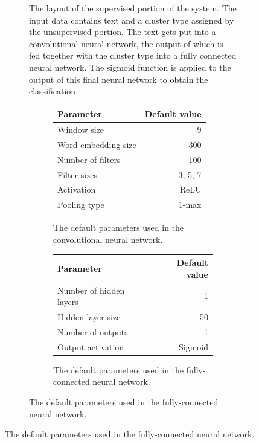 \begin{figure}[p]
\begin{subfigure}[b]{0.45\textwidth}
    \caption{The layout of the supervised portion of the system. The input data
      contains text and a cluster type assigned by the unsupervised portion. The
      text gets put into a convolutional neural network, the output of which is
      fed together with the cluster type into a fully connected neural network.
      The sigmoid function is applied to the output of this final neural network
    to obtain the classification.\label{fig:nn_layout}}
  \end{subfigure}
  \hspace{0.05\textwidth}
  \begin{subfigure}[b]{0.45\textwidth}
    \begin{subfigure}[b]{\textwidth}
      \centering
      \begin{tabular}{lr}
	\toprule
	Parameter & Default value \\
	\midrule
	Window size & 9 \\
	Word embedding size & 300 \\
	Number of filters & 100 \\
	Filter sizes & 3, 5, 7 \\
	Activation & ReLU \\
	Pooling type & 1-max \\
	\bottomrule
      \end{tabular}
      \caption{The default parameters used in the convolutional neural network.}
      \vspace{1cm}
    \end{subfigure}

    \begin{subfigure}[b]{\textwidth}
      \centering
      \begin{tabular}{lr}
	\toprule
	Parameter & Default value \\
	\midrule
	Number of hidden layers & 1 \\
	Hidden layer size & 50 \\
	Number of outputs & 1 \\
	Output activation & Sigmoid \\
	\bottomrule
      \end{tabular}
      \caption{The default parameters used in the fully-connected neural network.}
      \vspace{1cm}
    \end{subfigure}


\end{subfigure}
\end{figure}
